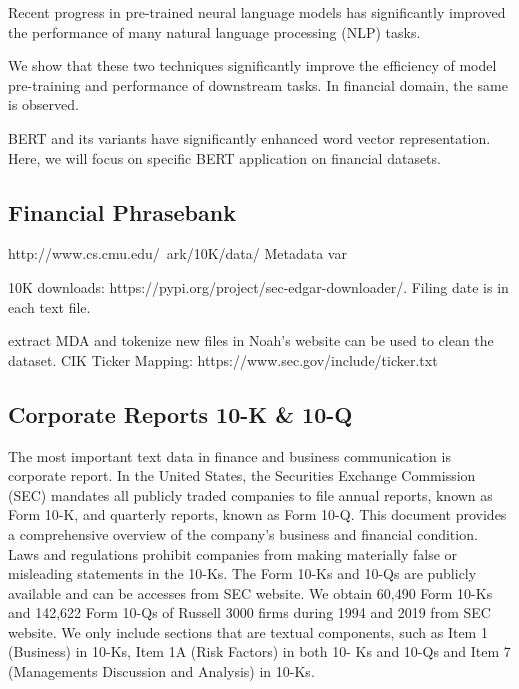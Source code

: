 \documentclass[11pt]{article}
\begin{document}
Recent progress in pre-trained neural language models has significantly improved the performance of many natural language processing (NLP) tasks.

We show that these two techniques significantly improve the efficiency of
model pre-training and performance of downstream tasks. In financial
domain, the same is observed.

BERT and its variants have significantly enhanced word vector representation. Here, we will focus on specific BERT application on financial
datasets.


\subsection{Financial Phrasebank}


http://www.cs.cmu.edu/~ark/10K/data/
Metadata var

10K downloads: https://pypi.org/project/sec-edgar-downloader/. Filing
date is in each text file.

extract MDA and tokenize new files in Noah's website can be used to clean the dataset.
CIK Ticker Mapping: https://www.sec.gov/include/ticker.txt



\subsection{Corporate Reports 10-K \& 10-Q} The most important text data in finance and business communication is corporate report. In the United States,
the Securities Exchange Commission (SEC) mandates all publicly traded companies to file annual
reports, known as Form 10-K, and quarterly reports, known as Form 10-Q. This document provides a comprehensive overview of the company’s
business and financial condition. Laws and regulations prohibit companies from making materially
false or misleading statements in the 10-Ks. The
Form 10-Ks and 10-Qs are publicly available and can be accesses from
SEC website. We obtain 60,490 Form 10-Ks and 142,622
Form 10-Qs of Russell 3000 firms during 1994 and
2019 from SEC website. We only include sections that are textual components, such as Item 1 (Business) in 10-Ks, Item 1A (Risk Factors) in both 10-
Ks and 10-Qs and Item 7 (Managements Discussion and Analysis) in 10-Ks.




\end{document}
